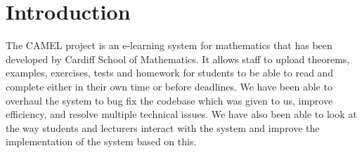 \section{Introduction}

	The CAMEL project is an e-learning system for mathematics that has been developed by Cardiff School of Mathematics. It allows staff to upload theorems, examples, exercises, tests and homework for students to be able to read and complete either in their own time or before deadlines. 
	We have been able to overhaul the system to bug fix the codebase which was given to us, improve efficiency, and resolve multiple technical issues. We have also been able to look at the way students and lecturers interact with the system and improve the implementation of the system based on this.
